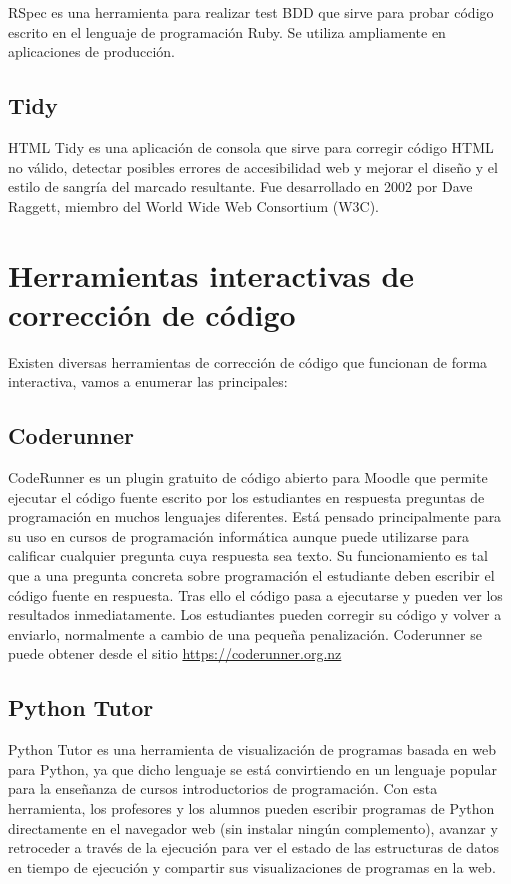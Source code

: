 RSpec es una herramienta para realizar test BDD que sirve para probar código escrito en el lenguaje de programación Ruby. Se utiliza ampliamente en aplicaciones de producción.

\subsection {Tidy}

HTML Tidy es una aplicación de consola que sirve para corregir código HTML no válido, detectar posibles errores de accesibilidad web y mejorar el diseño y el estilo de sangría del marcado resultante. Fue desarrollado en 2002 por Dave Raggett, miembro del World Wide Web Consortium (W3C).

\section {Herramientas interactivas de corrección de código}

Existen diversas herramientas de corrección de código que funcionan de forma interactiva, vamos a enumerar las principales:

\subsection {Coderunner}

CodeRunner es un plugin gratuito de código abierto para Moodle que permite ejecutar el código fuente escrito por los estudiantes en respuesta preguntas de programación en muchos lenguajes diferentes. Está pensado principalmente para su uso en cursos de programación informática aunque puede utilizarse para calificar cualquier pregunta cuya respuesta sea texto. Su funcionamiento es tal que a una pregunta concreta sobre programación el estudiante deben escribir el código fuente en respuesta. Tras ello el código pasa a ejecutarse y pueden ver los resultados inmediatamente. Los estudiantes pueden corregir su código y volver a enviarlo, normalmente a cambio de una pequeña penalización. Coderunner se puede obtener desde el sitio \url{https://coderunner.org.nz}

\subsection {Python Tutor}

Python Tutor es una herramienta de visualización de programas basada en web para Python, ya que dicho lenguaje se está convirtiendo en un lenguaje popular para la enseñanza de cursos introductorios de programación. Con esta herramienta, los profesores y los alumnos pueden escribir programas de Python directamente en el navegador web (sin instalar ningún complemento), avanzar y retroceder a través de la ejecución para ver el estado de las estructuras de datos en tiempo de ejecución y compartir sus visualizaciones de programas en la web.

